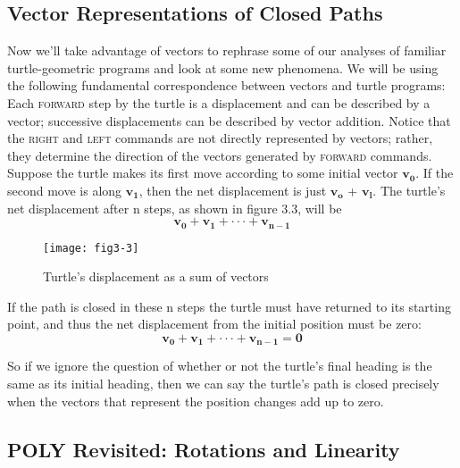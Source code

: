 \documentclass{book}
\begin{document}
\subsection{Vector Representations of Closed Paths}

Now we'll take advantage of vectors to rephrase some of our analyses of
familiar turtle-geometric programs and look at some new phenomena.
We will be using the following fundamental correspondence between vectors and turtle programs: Each \textsc{forward} step by the turtle is a displacement and can be described by a vector; successive displacements can
be described by vector addition. Notice that the \textsc{right} and \textsc{left} commands are not directly represented by vectors; rather, they determine
the direction of the vectors generated by \textsc{forward} commands.
Suppose the turtle makes its first move according to some initial vector \textbf{$\mathbf{v_0}$}. If the second move is along \textbf{$\mathbf{v_1}$}, then the net displacement is just
\textbf{$\mathbf{v_o}$} + \textbf{$\mathbf{v_l}$}. The turtle's net displacement after n steps, as shown in figure
3.3, will be
$$\mathbf{v_0} + \mathbf{v_1} + \cdot \cdot \cdot + \mathbf{v_{n-1}}$$

\begin{figure}
\begin{center}
\texttt{[image: fig3-3]}
\caption{Turtle's displacement as a sum of vectors}
\end{center}
\end{figure}

If the path is closed in these n steps the turtle must have returned to
its starting point, and thus the net displacement from the initial position
must be zero:
$$\mathbf{v_0}+\mathbf{v_1}+ \cdot \cdot \cdot + \mathbf{v_{n-1}} = \mathbf{0}$$

So if we ignore the question of whether or not the turtle's final heading
is the same as its initial heading, then we can say the turtle's path is
closed precisely when the vectors that represent the position changes
add up to zero.

\subsection{POLY Revisited: Rotations and Linearity}
\end{document}
